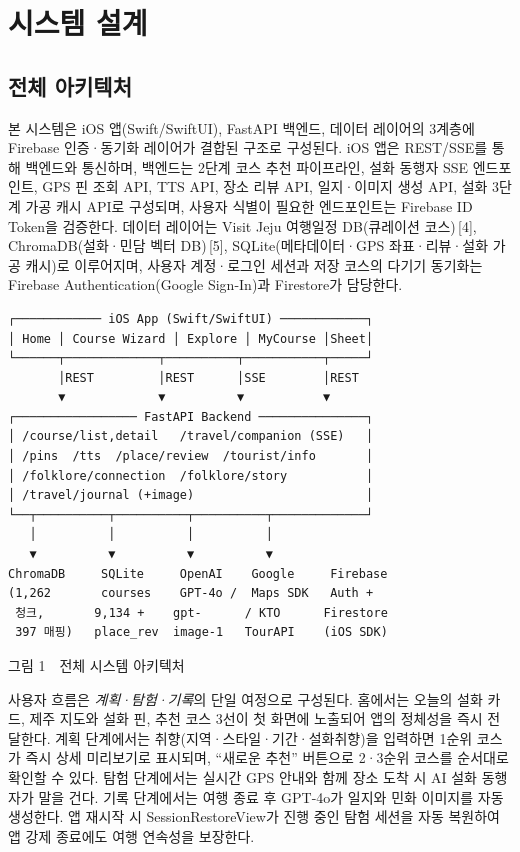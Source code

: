 \documentclass[10pt,twocolumn,a4paper]{article}
\begin{document}
\section{시스템 설계}

\subsection{전체 아키텍처}

본 시스템은 iOS 앱(Swift/SwiftUI), FastAPI 백엔드, 데이터 레이어의 3계층에
Firebase 인증·동기화 레이어가 결합된 구조로 구성된다. iOS 앱은 REST/SSE를 통해
백엔드와 통신하며, 백엔드는 2단계 코스 추천 파이프라인,
설화 동행자 SSE 엔드포인트, GPS 핀 조회 API, TTS API,
장소 리뷰 API, 일지·이미지 생성 API, 설화 3단계 가공 캐시 API로 구성되며, 사용자
식별이 필요한 엔드포인트는 Firebase ID Token을 검증한다.
데이터 레이어는 Visit Jeju 여행일정 DB(큐레이션 코스)\,[4], ChromaDB(설화·민담
벡터 DB)\,[5], SQLite(메타데이터·GPS 좌표·리뷰·설화 가공 캐시)로 이루어지며, 사용자
계정·로그인 세션과 저장 코스의 다기기 동기화는 Firebase Authentication(Google
Sign-In)과 Firestore가 담당한다.

\begin{footnotesize}
\begin{verbatim}
┌──────────── iOS App (Swift/SwiftUI) ────────────┐
│ Home │ Course Wizard │ Explore │ MyCourse │Sheet│
└──────┬─────────────┬──────────┬───────────┬─────┘
       │REST         │REST      │SSE        │REST
       ▼             ▼          ▼           ▼
┌───────────────── FastAPI Backend ───────────────┐
│ /course/list,detail   /travel/companion (SSE)   │
│ /pins  /tts  /place/review  /tourist/info       │
│ /folklore/connection  /folklore/story           │
│ /travel/journal (+image)                        │
└──┬──────────┬──────────┬──────────┬─────────────┘
   │          │          │          │
   ▼          ▼          ▼          ▼
ChromaDB     SQLite     OpenAI    Google     Firebase
(1,262       courses    GPT-4o /  Maps SDK   Auth +
 청크,       9,134 +    gpt-      / KTO      Firestore
 397 매핑)   place_rev  image-1   TourAPI    (iOS SDK)
\end{verbatim}
\end{footnotesize}

\begin{center}
{\small 그림 1~~전체 시스템 아키텍처}
\end{center}

사용자 흐름은 \emph{계획·탐험·기록}의 단일 여정으로 구성된다. 홈에서는
오늘의 설화 카드, 제주 지도와 설화 핀, 추천 코스 3선이 첫 화면에 노출되어
앱의 정체성을 즉시 전달한다. 계획 단계에서는 취향(지역·스타일·기간·설화취향)을
입력하면 1순위 코스가 즉시 상세 미리보기로 표시되며, ``새로운 추천'' 버튼으로
2·3순위 코스를 순서대로 확인할 수 있다. 탐험 단계에서는 실시간 GPS 안내와
함께 장소 도착 시 AI 설화 동행자가 말을 건다. 기록 단계에서는 여행 종료
후 GPT-4o가 일지와 민화 이미지를 자동 생성한다. 앱 재시작 시 SessionRestoreView가
진행 중인 탐험 세션을 자동 복원하여 앱 강제 종료에도 여행 연속성을 보장한다.
\end{document}
